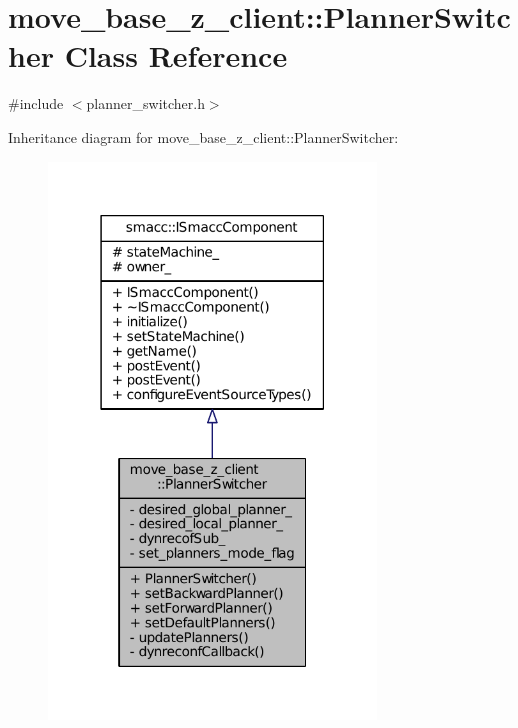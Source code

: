 \hypertarget{classmove__base__z__client_1_1PlannerSwitcher}{}\section{move\+\_\+base\+\_\+z\+\_\+client\+:\+:Planner\+Switcher Class Reference}
\label{classmove__base__z__client_1_1PlannerSwitcher}


{\ttfamily \#include $<$planner\+\_\+switcher.\+h$>$}



Inheritance diagram for move\+\_\+base\+\_\+z\+\_\+client\+:\+:Planner\+Switcher\+:
\nopagebreak
\begin{figure}[H]
\begin{center}
\leavevmode
\includegraphics[width=247pt]{classmove__base__z__client_1_1PlannerSwitcher__inherit__graph}
\end{center}
\end{figure}


